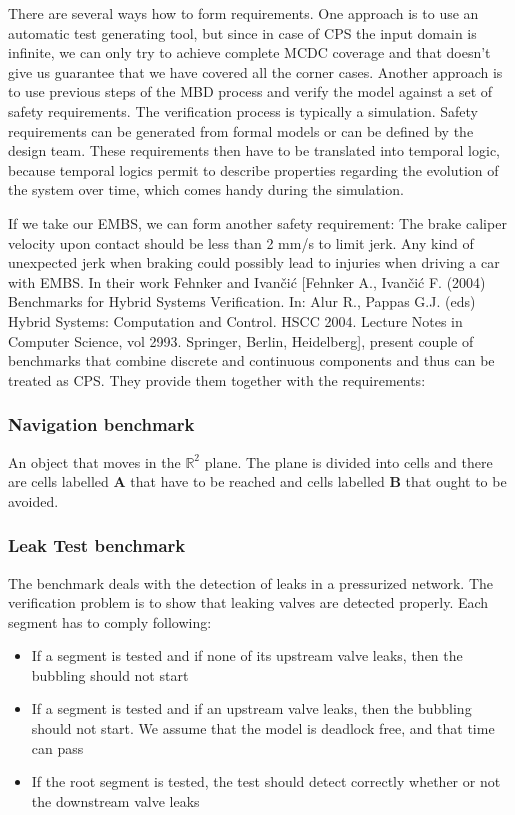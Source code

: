 There are several ways how to form requirements. One approach is to use an automatic test generating tool, but since in case of CPS the input domain is infinite, we can only try to achieve complete MCDC coverage and that doesn't give us guarantee that we have covered all the corner cases. Another approach is to use previous steps of the MBD process and verify the model against a set of safety requirements. The verification process is typically a simulation. Safety requirements can be generated from formal models or can be defined by the design team. These requirements then have to be translated into temporal logic, because temporal logics permit to describe properties regarding the evolution of the system over time, which comes handy during the simulation.

If we take our EMBS, we can form another safety requirement: The brake caliper velocity upon contact should be less than 2 mm/s to limit jerk. Any kind of unexpected jerk when braking could possibly lead to injuries when driving a car with EMBS. In their work Fehnker and Ivančić [Fehnker A., Ivančić F. (2004) Benchmarks for Hybrid Systems Verification. In: Alur R., Pappas G.J. (eds) Hybrid Systems: Computation and Control. HSCC 2004. Lecture Notes in Computer Science, vol 2993. Springer, Berlin, Heidelberg], present couple of benchmarks that combine discrete and continuous components and thus can be treated as CPS. They provide them together with the requirements:

\subsubsection{Navigation benchmark}

An object that moves in the ${\mathbb{R}}^2$ plane. The plane is divided into cells and there are cells labelled \textbf{A} that have to be reached and cells labelled \textbf{B} that ought to be avoided.

\subsubsection{Leak Test benchmark}

The benchmark deals with the detection of leaks in a pressurized network. The verification problem is to show that leaking valves are detected properly. Each segment has to comply following:

\begin{itemize}
	\item If a segment is tested and if none of its upstream valve leaks, then the bubbling should not start
	\item If a segment is tested and if an upstream valve leaks, then the bubbling should not start. We assume that the model is deadlock free, and that time can pass
	\item If the root segment is tested, the test should detect correctly whether or not the downstream valve leaks
\end{itemize}

